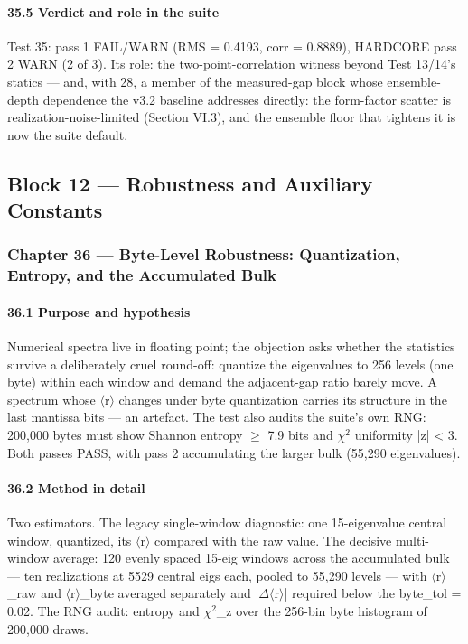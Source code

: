 \documentclass[10pt]{article}
\begin{document}
\paragraph{35.5 Verdict and role in the suite}

Test 35: pass 1 FAIL/WARN (RMS = 0.4193, corr = 0.8889), HARDCORE pass 2 WARN (2 of 3). Its role: the two-point-correlation witness beyond Test 13/14's statics --- and, with 28, a member of the measured-gap block whose ensemble-depth dependence the v3.2 baseline addresses directly: the form-factor scatter is realization-noise-limited (Section VI.3), and the ensemble floor that tightens it is now the suite default.

\subsection{Block 12 --- Robustness and Auxiliary Constants}

\subsubsection{Chapter 36 --- Byte-Level Robustness: Quantization, Entropy, and the Accumulated Bulk}

\paragraph{36.1 Purpose and hypothesis}

Numerical spectra live in floating point; the objection asks whether the statistics survive a deliberately cruel round-off: quantize the eigenvalues to 256 levels (one byte) within each window and demand the adjacent-gap ratio barely move. A spectrum whose $\langle$r$\rangle$ changes under byte quantization carries its structure in the last mantissa bits --- an artefact. The test also audits the suite's own RNG: 200,000 bytes must show Shannon entropy $\ge$ 7.9 bits and $\chi$$^2$ uniformity |z| < 3. Both passes PASS, with pass 2 accumulating the larger bulk (55,290 eigenvalues).

\paragraph{36.2 Method in detail}

Two estimators. The legacy single-window diagnostic: one 15-eigenvalue central window, quantized, its $\langle$r$\rangle$ compared with the raw value. The decisive multi-window average: 120 evenly spaced 15-eig windows across the accumulated bulk --- ten realizations at 5529 central eigs each, pooled to 55,290 levels --- with $\langle$r$\rangle$\_raw and $\langle$r$\rangle$\_byte averaged separately and |$\Delta$$\langle$r$\rangle$| required below the byte\_tol = 0.02. The RNG audit: entropy and $\chi$$^2$\_z over the 256-bin byte histogram of 200,000 draws.
\end{document}
